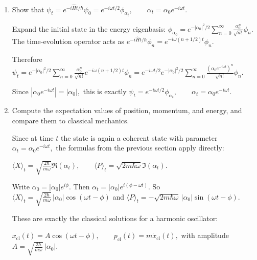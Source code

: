 \documentclass[11pt,a4paper]{scrartcl}
\begin{document}
\begin{enumerate}[label=(\alph*)]
    \item Show that
    $
    \psi_t = e^{-i\hat H t/\hbar}\psi_0
    = e^{-i\omega t/2}\phi_{\alpha_t},
    \qquad
    \alpha_t=\alpha_0 e^{-i\omega t}.
    $

    \begin{calculationbox}
    Expand the initial state in the energy eigenbasis:
    $
    \phi_{\alpha_0}
    =
    e^{-|\alpha_0|^2/2}\sum_{n=0}^\infty
    \frac{\alpha_0^n}{\sqrt{n!}}\phi_n.
    $
    The time-evolution operator acts as
    $
    e^{-i\hat H t/\hbar}\phi_n
    = e^{-i\omega(n+1/2)t}\phi_n.
    $

    Therefore $\psi_t
        = e^{-|\alpha_0|^2/2}\sum_{n=0}^\infty
        \frac{\alpha_0^n}{\sqrt{n!}}
        e^{-i\omega(n+1/2)t}\phi_n 
        = e^{-i\omega t/2}
        e^{-|\alpha_0|^2/2}
        \sum_{n=0}^\infty
        \frac{(\alpha_0 e^{-i\omega t})^n}{\sqrt{n!}}\phi_n$.

    Since
    $
    |\alpha_0 e^{-i\omega t}|=|\alpha_0|,
    $
    this is exactly
    $
    \psi_t = e^{-i\omega t/2}\phi_{\alpha_t},
    \qquad
    \alpha_t=\alpha_0 e^{-i\omega t}.
    $
    \end{calculationbox}

    \item Compute the expectation values of position, momentum, and energy, and compare them to classical mechanics.

    \begin{calculationbox}
    Since at time $t$ the state is again a coherent state with parameter
    $
    \alpha_t=\alpha_0 e^{-i\omega t},
    $
    the formulas from the previous section apply directly:

    $
    \langle X\rangle_t=\sqrt{\frac{2\hbar}{m\omega}}\Re(\alpha_t),
    \qquad
    \langle P\rangle_t=\sqrt{2m\hbar\omega}\Im(\alpha_t).
    $

    Write
    $
    \alpha_0 = |\alpha_0|e^{i\phi}.
    $
    Then
    $
    \alpha_t=|\alpha_0|e^{i(\phi-\omega t)}.
    $
    So
    $
    \langle X\rangle_t=
    \sqrt{\frac{2\hbar}{m\omega}}\,|\alpha_0|\cos(\omega t-\phi)
    $
    and
    $
    \langle P\rangle_t=
    -\sqrt{2m\hbar\omega}\,|\alpha_0|\sin(\omega t-\phi).
    $

    These are exactly the classical solutions for a harmonic oscillator:

    $
    x_{\mathrm{cl}}(t)=A\cos(\omega t-\phi),\qquad
    p_{\mathrm{cl}}(t)=m\dot x_{\mathrm{cl}}(t),
    $
    with amplitude
    $
    A=\sqrt{\frac{2\hbar}{m\omega}}\,|\alpha_0|.
    $


\end{calculationbox}
\end{enumerate}
\end{document}
